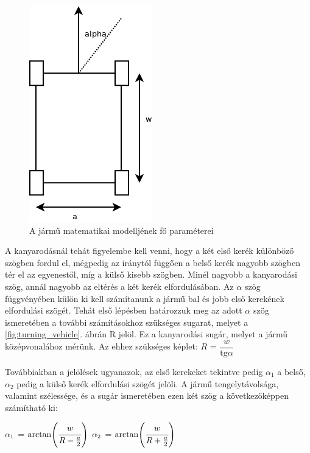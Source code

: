 \begin{figure}[h!]
\centering
\includegraphics[scale=0.45]{images/vehicle.png}
\caption{A jármű matematikai modelljének fő paraméterei}
\label{fig:vehicle}
\end{figure}


A kanyarodásnál tehát figyelembe kell venni, hogy a két első kerék különböző szögben fordul el, mégpedig az iránytól függően a belső kerék nagyobb szögben tér el az egyenestől, míg a külső kisebb szögben. Minél nagyobb a kanyarodási szög, annál nagyobb az eltérés a két kerék elfordulásában.
Az $\alpha$ szög függvényében külön ki kell számítanunk a jármű bal és jobb első kerekének elfordulási szögét.
Tehát első lépésben határozzuk meg az adott $\alpha$ szög ismeretében a további számításokhoz szükséges sugarat,
melyet a \ref{fig:turning_vehicle}. ábrán R jelöl. Ez a kanyarodási sugár, melyet a jármű középvonalához mérünk.
Az ehhez szükséges képlet:\vspace{2mm}
$R$ = $\dfrac{w}{\text{tg} \alpha}$ \vspace{5mm}

Továbbiakban a jelölések ugyanazok, az első kerekeket tekintve pedig $\alpha_1$ a belső, $\alpha_2$ pedig a külső kerék elfordulási szögét jelöli.  
A jármű tengelytávolsága, valamint szélessége, és a sugár ismeretében ezen két szög a következőképpen számítható ki:\vspace{5mm}

$\alpha\textsubscript{1}$ = $\text{arctan}\Bigg(\cfrac{w}{R-\frac{a}{2}}\Bigg)$ \hspace{1cm} $\alpha\textsubscript{2}$ = $\text{arctan}\Bigg(\cfrac{w}{R+\frac{a}{2}}\Bigg)$\vspace{5mm}

